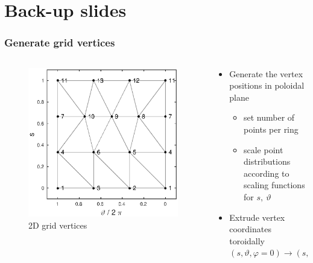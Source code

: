 \documentclass{beamer}
\begin{document}
\section{Back-up slides}
\begin{frame}
\frametitle{Generate grid vertices}
\vspace{-1 cm}
\begin{columns}[onlytextwidth]
	\begin{column}{0.5\textwidth}
		\begin{center}
			\begin{figure}
				\includegraphics[trim={1cm 0cm 1cm 0cm},clip,width=1.0\textwidth]{FIGURES/Delaunay_Connected_PrismFaces.eps}
				\caption{2D grid vertices}
			\end{figure}
		\end{center}
	\end{column}
	\begin{column}{0.5\textwidth}
		\vspace{0 cm}
		\begin{center}
			\begin{itemize}
				\item Generate the vertex positions in poloidal plane
				\begin{itemize}
					\item set number of points per ring
					\item scale point distributions according to scaling functions for $s,~\vartheta$
				\end{itemize}
				\item Extrude vertex coordinates toroidally $(s,\vartheta, \varphi=0)\rightarrow (s,\vartheta, \varphi)$
			\end{itemize}
		\end{center}
	\end{column}
\end{columns}
\end{frame}
\end{document}
